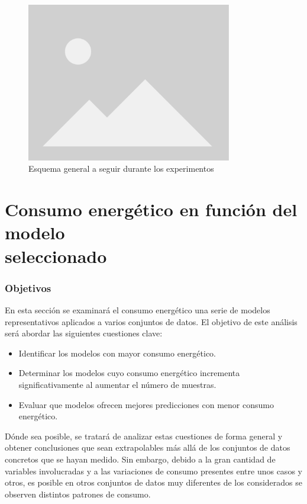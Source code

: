 \begin{figure}[H]
  \centerline{
     \includegraphics[width=0.8\textwidth, keepaspectratio]{img/placeholder.png}
  }
  \caption{Esquema general a seguir durante los experimentos}
  \label{fig:esquema-experimentos}
\end{figure}

\section{Consumo energético en función del modelo\\ seleccionado}
\label{sec:test-1-models}

\subsubsection{Objetivos}

En esta sección se examinará el consumo energético una serie de modelos representativos aplicados a varios conjuntos de datos. El objetivo de este análisis será abordar las siguientes cuestiones clave:

\begin{itemize}
    \item Identificar los modelos con mayor consumo energético.
    \item Determinar los modelos cuyo consumo energético incrementa significativamente al aumentar el número de muestras.
    \item Evaluar que modelos ofrecen mejores predicciones con menor consumo energético.
\end{itemize}

Dónde sea posible, se tratará de analizar estas cuestiones de forma general y obtener conclusiones que sean extrapolables más allá de los conjuntos de datos concretos que se hayan medido. Sin embargo, debido a la gran cantidad de variables involucradas y a las variaciones de consumo presentes entre unos casos y otros, es posible en otros conjuntos de datos muy diferentes de los considerados se observen distintos patrones de consumo.

